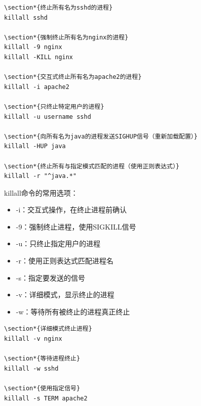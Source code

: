 \documentclass[12pt,UTF8]{ctexbook}
\begin{document}
\begin{verbatim}
\section*{终止所有名为sshd的进程}
killall sshd

\section*{强制终止所有名为nginx的进程}
killall -9 nginx
killall -KILL nginx

\section*{交互式终止所有名为apache2的进程}
killall -i apache2

\section*{只终止特定用户的进程}
killall -u username sshd

\section*{向所有名为java的进程发送SIGHUP信号（重新加载配置）}
killall -HUP java

\section*{终止所有与指定模式匹配的进程（使用正则表达式）}
killall -r "^java.*"
\end{verbatim}

killall命令的常用选项：
\begin{itemize}
    \item -i：交互式操作，在终止进程前确认
    \item -9：强制终止进程，使用SIGKILL信号
    \item -u：只终止指定用户的进程
    \item -r：使用正则表达式匹配进程名
    \item -s：指定要发送的信号
    \item -v：详细模式，显示终止的进程
    \item -w：等待所有被终止的进程真正终止
\end{itemize}

\begin{verbatim}
\section*{详细模式终止进程}
killall -v nginx

\section*{等待进程终止}
killall -w sshd

\section*{使用指定信号}
killall -s TERM apache2
\end{verbatim}
\end{document}
